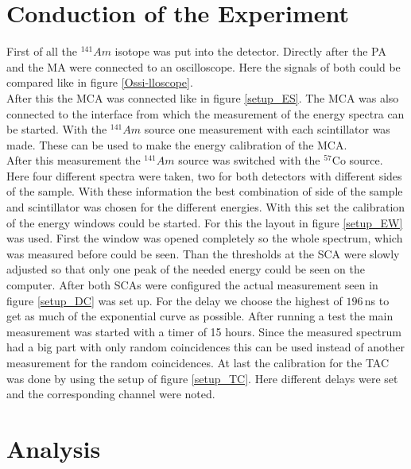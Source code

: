 \documentclass[30pt,a4paper]{article}
\begin{document}
 	\section{Conduction of the Experiment}
 	First of all the $^{141}Am$ isotope was put into the detector. Directly after the PA and the MA were connected to an oscilloscope. Here the signals of both could be compared like in figure \ref{Ossi-lloscope}.\\
 	After this the MCA was connected like in figure \ref{setup_ES}. The MCA was also connected to the interface from which the measurement of the energy spectra can be started. With the $^{141}Am$ source one measurement with each scintillator was made. These can be used to make the energy calibration of the MCA.\\
 	After this measurement the  $^{141}Am$ source was switched with the $^{57}$Co source. Here four different spectra were taken, two for both detectors with different sides of the sample. With these information the best combination of side of the sample and scintillator was chosen for the different energies. With this set the calibration of the energy windows could be started. For this the layout in figure \ref{setup_EW} was used. First the window was opened completely so the whole spectrum, which was measured before could be seen. Than the thresholds at the SCA were slowly adjusted so that only one peak of the needed energy could be seen on the computer. After both SCAs were configured the actual measurement seen in figure \ref{setup_DC} was set up. For the delay we choose the highest of $196$\,ns to get as much of the exponential curve as possible. After running a test the main measurement was started with a timer of 15 hours. Since the measured spectrum had a big part with only random coincidences this can be used instead of another measurement for the random coincidences. At last the calibration for the TAC was done by using the setup of figure \ref{setup_TC}. Here different delays were set and the corresponding channel were noted.
 	\section{Analysis}
\end{document}
